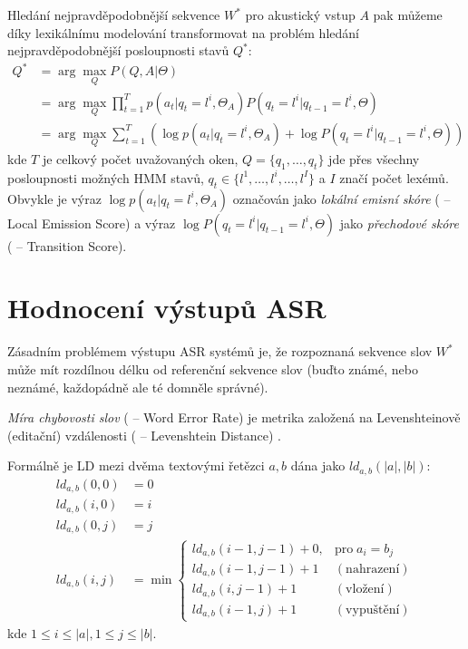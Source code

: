 Hledání nejpravděpodobnější sekvence $W^*$ pro akustický vstup $A$ pak můžeme díky lexikálnímu modelování transformovat na problém hledání nejpravděpodobnější posloupnosti stavů $Q^*$:
%
\begin{align}
	\label{eq:lm_state}
	Q^* &= \arg \max_Q P(Q,A|\Theta)\\
	    &= \arg \max_Q \prod\limits_{t=1}^T p(a_t|q_t = l^i, \Theta_A) P(q_t = l^i|q_{t-1} = l^i, \Theta)\\
	    &= \arg \max_Q \sum\limits_{t=1}^T (\log p(a_t|q_t = l^i, \Theta_A) + \log P(q_t = l^i|q_{t-1} = l^i, \Theta)) 
\end{align}
%
kde $T$ je celkový počet uvažovaných oken, $Q = \{q_1,\dots,q_t\}$ jde přes všechny posloupnosti možných HMM stavů, $q_t \in \{l^1,\dots,l^i,\dots,l^I\}$ a $I$ značí počet lexémů. Obvykle je výraz $\log p(a_t|q_t = l^i, \Theta_A)$ označován jako {\sl lokální emisní skóre} ( -- Local Emission Score) a výraz $\log P(q_t = l^i|q_{t-1} = l^i, \Theta)$ jako {\sl přechodové skóre} ( -- Transition Score).

\section{Hodnocení výstupů ASR}

Zásadním problémem výstupu ASR systémů je, že rozpoznaná sekvence slov $W^*$ může mít rozdílnou délku od referenční sekvence slov (buďto známé, nebo neznámé, každopádně ale té domněle správné). 

{\sl Míra chybovosti slov} ( -- Word Error Rate) je metrika založená na Levenshteinově (editační) vzdálenosti ( -- Levenshtein Distance) \cite{schluter_2010}.

Formálně je LD mezi dvěma textovými řetězci $a, b$ dána jako $ld_{a,b}(|a|,|b|)$:
%
\begin{align}
	\label{eq:ld}
	ld_{a,b}(0,0) &= 0\\
	ld_{a,b}(i,0) &= i\\
	ld_{a,b}(0,j) &= j\\
	ld_{a,b}(i,j) &= 
	\min
	\begin{cases}
		ld_{a,b}(i-1,j-1)+0, & \text{pro}\;a_i = b_j \\
		ld_{a,b}(i-1,j-1)+1  & (\text{nahrazení}) \\
		ld_{a,b}(i,j-1)+1    & (\text{vložení}) \\
		ld_{a,b}(i-1,j)+1    & (\text{vypuštění})
	\end{cases}
\end{align}
%
kde $1 \le i \le |a|, 1 \le j \le |b|$.

